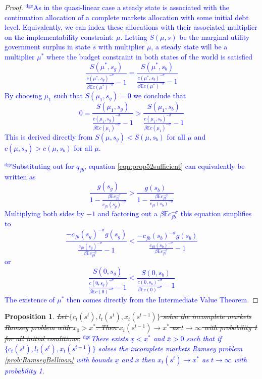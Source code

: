 \documentclass[12pt]{article}
\newcommand{\dge}[1]{\textcolor{blue}{$^{\textrm{dge}}${#1}}}
\newcommand{\EE}{\mathbb E}
\newtheorem{proposition}[theorem]{Proposition}
\begin{document}
\begin{proof}\dge{As in the quasi-linear case a steady state is associated with the continuation allocation of a complete markets allocation with some initial debt level.  Equivalently, we can index these allocations with their associated multiplier on the implementability constraint: $\mu$.  Letting $S(\mu,s)$ be the marginal utility government surplus in state $s$ with multiplier $\mu$, a steady state will be a multiplier $\mu^*$ where the budget constraint in both states of the world is satisfied 
\[
	\frac{S(\mu^*,s_g)}{\frac{c(\mu^*,s_g)^{-\sigma}}{\beta \EE c(\mu^*)^{-\sigma}}-1} =\frac{S(\mu^*,s_b)}{\frac{c(\mu^*,s_b)^{-\sigma}}{\beta \EE c(\mu^*)^{-\sigma}}-1}
\]  By choosing $\mu_1$ such that $S(\mu_1,s_g) =0$ we conclude that 
\[
	0 = \frac{S(\mu_1,s_g)}{\frac{c(\mu_1,s_g)^{-\sigma}}{\beta \EE c(\mu_1)^{-\sigma}}-1} > \frac{S(\mu_1,s_b)}{\frac{c(\mu_1,s_b)^{-\sigma}}{\beta \EE c(\mu_1)^{-\sigma}}-1}
\]  This is derived directly from $S(\mu,s_g) < S(\mu,s_b)$ for all $\mu$ and $c(\mu,s_g) > c(\mu,s_b)$ for all $\mu$. }

\dge{Substituting out for $q_{fb}$, equation \eqref{eqn:prop52sufficient} can equivalently be written as
\[
	\frac{g(s_g)}{1-\frac{\beta\EE c_{fb}^{-\sigma}}{c_{fb}(s_g)^{-\sigma}}} > \frac{g(s_b)}{1-\frac{\beta\EE c_{fb}^{-\sigma}}{c_{fb}(s_b)^{-\sigma}}}
\]  Multiplying both sides by $-1$ and factoring out a $\beta\EE c_{fb}^{-\sigma}$ this equation simplifies to 
\[
	\frac{-c_{fb}(s_g)^{-\sigma}g(s_g) }{\frac{c_{fb}(s_g)^{-\sigma}}{\beta \EE c_{fb}^{-\sigma}}-1} < \frac{-c_{fb}(s_b)^{-\sigma}g(s_b) }{\frac{c_{fb}(s_b)^{-\sigma}}{\beta \EE c_{fb}^{-\sigma}}-1}
\]or 
\[
	\frac{S(0,s_g)}{\frac{c(0,s_g)^{-\sigma}}{\beta \EE c(0)^{-\sigma}}-1} <\frac{S(0,s_b)}{\frac{c(0,s_b)^{-\sigma}}{\beta \EE c(0)^{-\sigma}}-1}
\]  The existence of $\mu^*$ then comes directly from the Intermediate Value Theorem.}
\end{proof}


	\begin{proposition}\label{prop:convergenceU} \st{ Let $\{c_t(s^t), l_t(s^t), x_t(s^{t-1})\}$ solve the incomplete markets Ramsey problem with $x_0 > x^*$.  Then  $x_t(s^{t-1})\rightarrow x^*$ as $t\rightarrow \infty$ with probability 1 for all initial conditions.}  \dge{There exists $\underline x < x^*$ and $\overline x >0$ such that if $\{c_t(s^t), l_t(s^t), x_t(s^{t-1})\}$ solves the incomplete markets Ramsey problem \ref{prob:RamseyBellman} with bounds $\underline x$ and $\overline x$ then $x_t(s^t)\rightarrow x^*$ as $t\rightarrow\infty$ with probability 1.}
	
	\end{proposition}
\end{document}
